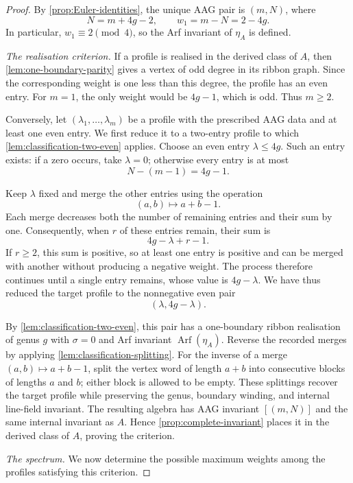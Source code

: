 \documentclass[11pt]{amsart}
\theoremstyle{definition}
\theoremstyle{plain}
\theoremstyle{definition}
\theoremstyle{definition}
\newcommand{\Arf}{\operatorname{Arf}}
\begin{document}
\begin{proof}
By \cref{prop:Euler-identities}, the unique AAG pair is
$(m,N)$, where
\[
 N=m+4g-2,
 \qquad
 w_1=m-N=2-4g.
\]
In particular, $w_1\equiv2\pmod4$, so the Arf invariant
of $\eta_A$ is defined.

\smallskip
\noindent\emph{The realisation criterion.}
If a profile is realised in the derived class of $A$,
then \cref{lem:one-boundary-parity} gives a vertex of
odd degree in its ribbon graph.
Since the corresponding weight is one less than this
degree, the profile has an even entry.
For $m=1$, the only weight would be $4g-1$, which is
odd. Thus $m\geq2$.

Conversely, let $(\lambda_1,\ldots,\lambda_m)$ be a
profile with the prescribed AAG data and at least
one even entry.
We first reduce it to a two-entry profile to which
\cref{lem:classification-two-even} applies.
Choose an even entry $\lambda\leq4g$.
Such an entry exists: if a zero occurs, take
$\lambda=0$; otherwise every entry is at most
\[
 N-(m-1)=4g-1.
\]

Keep $\lambda$ fixed and merge the other entries
using the operation
\[
 (a,b)\longmapsto a+b-1.
\]
Each merge decreases both the number of remaining
entries and their sum by one.
Consequently, when $r$ of these entries remain,
their sum is
\[
 4g-\lambda+r-1.
\]
If $r\geq2$, this sum is positive, so at least one
entry is positive and can be merged with another
without producing a negative weight.
The process therefore continues until a single
entry remains, whose value is $4g-\lambda$.
We have thus reduced the target profile to the
nonnegative even pair
\[
 (\lambda,4g-\lambda).
\]

By \cref{lem:classification-two-even}, this pair has
a one-boundary ribbon realisation of genus $g$ with
$\sigma=0$ and Arf invariant $\Arf(\eta_A)$.
Reverse the recorded merges by applying
\cref{lem:classification-splitting}.
For the inverse of a merge $(a,b)\mapsto a+b-1$,
split the vertex word of length $a+b$ into consecutive
blocks of lengths $a$ and $b$; either block is allowed
to be empty.
These splittings recover the target profile while
preserving the genus, boundary winding, and internal
line-field invariant.
The resulting algebra has AAG invariant $[(m,N)]$
and the same internal invariant as $A$.
Hence \cref{prop:complete-invariant} places it in the
derived class of $A$, proving the criterion.

\smallskip
\noindent\emph{The spectrum.}
We now determine the possible maximum weights among
the profiles satisfying this criterion.


\end{proof}
\end{document}
